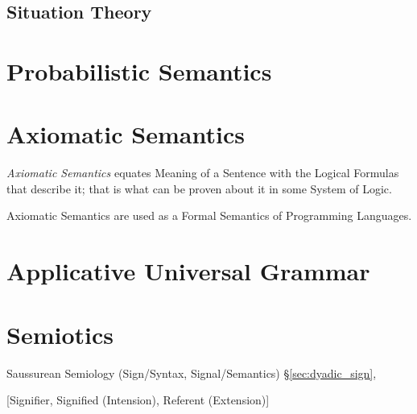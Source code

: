 \subsection{Situation Theory}\label{sec:situation_theory}



\section{Probabilistic Semantics}\label{sec:probabilistic_semantics}

\section{Axiomatic Semantics}\label{sec:axiomatic_semantics}

\emph{Axiomatic Semantics} equates Meaning of a Sentence with the
Logical Formulas that describe it; that is what can be proven about it
in some System of Logic.

Axiomatic Semantics are used as a Formal Semantics of Programming
Languages.



\section{Applicative Universal Grammar}
\label{sec:applicative_universal_grammar}

\section{Semiotics}\label{sec:semiotics}

Saussurean Semiology (Sign/Syntax, Signal/Semantics)
\S\ref{sec:dyadic_sign},

[Signifier, Signified (Intension), Referent (Extension)]

